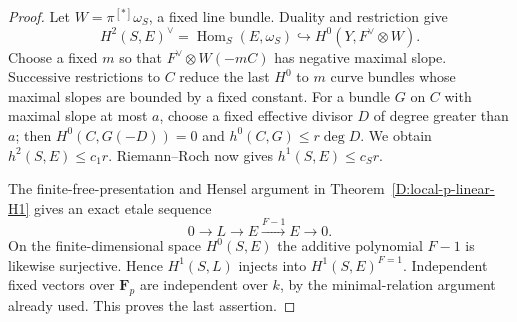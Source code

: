 \begin{proof}
Let $W=\pi^{[*]}\omega_S$, a fixed line bundle. Duality and restriction
give
\[
 H^2(S,E)^\vee=\operatorname{Hom}_S(E,\omega_S)
 \hookrightarrow H^0(Y,F^\vee\otimes W).
\]
Choose a fixed $m$ so that $F^\vee\otimes W(-mC)$ has negative maximal
slope. Successive restrictions to $C$ reduce the last $H^0$ to $m$
curve bundles whose maximal slopes are bounded by a fixed constant.
For a bundle $G$ on $C$ with maximal slope at most $a$, choose a fixed
effective divisor $D$ of degree greater than $a$; then
$H^0(C,G(-D))=0$ and $h^0(C,G)\le r\deg D$. We obtain
$h^2(S,E)\le c_1r$. Riemann--Roch now gives $h^1(S,E)\le c_Sr$.

The finite-free-presentation and Hensel argument in
Theorem~\ref{D:local-p-linear-H1} gives an exact etale sequence
\[
 0\longrightarrow L\longrightarrow E
 \xrightarrow{F-1}E\longrightarrow0.
\]
On the finite-dimensional space $H^0(S,E)$ the additive polynomial
$F-1$ is likewise surjective. Hence $H^1(S,L)$ injects into
$H^1(S,E)^{F=1}$. Independent fixed vectors over $\mathbf F_p$ are
independent over $k$, by the minimal-relation argument already used.
This proves the last assertion.
\end{proof}

